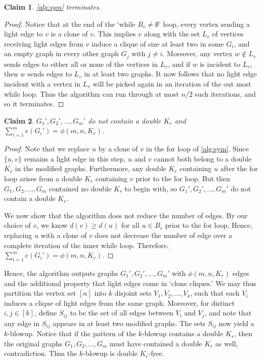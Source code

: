 \documentclass[12pt]{article}
\newtheorem{claim}{Claim}
\begin{document}
\begin{claim}
  \cref{alg:sym} terminates.
\end{claim}

\begin{proof}
  Notice that at the end of the `while $B_v \neq \emptyset$' loop, every vertex sending a light edge to $v$ is a clone of $v$. This implies $v$ along with the set $L_v$ of vertices receiving light edges from $v$ induce a clique of size at least two in some $G_i$, and an empty graph in every other graph $G_j$ with $j \neq i$. Moreover, any vertex $w \notin L_v$ sends edges to either all or none of the vertices in $L_v$, and if $w$ is incident to $L_v$, then $w$ sends edges to $L_v$ in at least two graphs. It now follows that no light edge incident with a vertex in $L_v$ will be picked again in an iteration of the out most while loop. Thus the algorithm can run through at most $n/2$ such iterations, and so it terminates.
\end{proof}

\begin{claim}
  $G_1', G_2', \ldots, G_m'$ do not contain a double $K_r$ and $\sum_{i = 1}^m e(G_i') = \phi(m, n, K_r)$. 
\end{claim}

\begin{proof}
  Note that we replace $u$ by a clone of $v$ in the for loop of \cref{alg:sym}. Since $\{u, v\}$ remains a light edge in this step, $u$ and $v$ cannot both belong to a double $K_r$ in the modified graphs. Furthermore, any double $K_r$ containing $u$ after the for loop arises from a double $K_r$ containing $v$ prior to the for loop. But then $G_1, G_2, \ldots, G_m$ contained no double $K_r$ to begin with, so $G_1', G_2', \ldots, G_m'$ do not contain a double $K_r$.

  We now show that the algorithm does not reduce the number of edges. By our choice of $v$, we know $d(v) \geq d(u)$ for all $u \in B_v$ prior to the for loop. Hence, replacing $u$ with a clone of $v$ does not decrease the number of edge over a complete iteration of the inner while loop. Therefore, $\sum_{i = 1}^m e(G_i') = \phi(m, n, K_r)$. 
\end{proof}

Hence, the algorithm outputs graphs $G_1', G_2', \ldots, G_m'$ with $\phi(m, n, K_r)$ edges and the additional property that light edges come in `clone cliques.' We may thus partition the vertex set $[n]$ into $k$ disjoint sets $V_1, V_2, \ldots, V_k$, such that each $V_i$ induces a clique of light edges from the same graph. Moreover, for distinct $i, j \in [k]$, define $S_{ij}$ to be the set of all edges between $V_i$ and $V_j$, and note that any edge in $S_{ij}$ appears in at least two modified graphs. The sets $S_{ij}$ now yield a $k$-blowup. Notice that if the pattern of the $k$-blowup contains a double $K_r$, then the original graphs $G_1, G_2, \ldots, G_m$ must have contained a double $K_r$ as well, contradiction. Thus the $k$-blowup is double $K_r$-free. 
\end{document}
